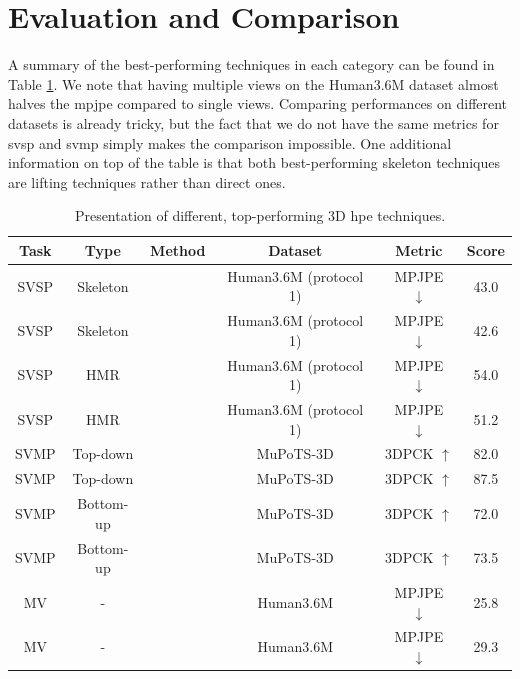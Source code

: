 \documentclass[runningheads]{llncs}
\begin{document}
\section{Evaluation and Comparison}
A summary of the best-performing techniques in each category can be found in Table \ref{table: presentation of results}. We note that having multiple views on the Human3.6M dataset almost halves the \ac{mpjpe} compared to single views. Comparing performances on different datasets is already tricky, but the fact that we do not have the same metrics for \ac{svsp} and \ac{svmp} simply makes the comparison impossible. One additional information on top of the table is that both best-performing skeleton techniques are lifting techniques rather than direct ones.
\begin{table}
  \centering
  \caption{Presentation of different, top-performing 3D \ac{hpe} techniques.}
  \label{table: presentation of results}
  \begin{tabular}{|cccccc|}
    \hline
    Task & Type      & Method                                          & Dataset                & Metric             & Score \\ \hline
    SVSP & Skeleton  & \cite{multi hypothesis transformer}             & Human3.6M (protocol 1) & MPJPE $\downarrow$ & 43.0  \\
    SVSP & Skeleton  & \cite{hrnet}                                    & Human3.6M (protocol 1) & MPJPE $\downarrow$ & 42.6  \\
    SVSP & HMR       & \cite{mesh reconstruction with transformers}    & Human3.6M (protocol 1) & MPJPE $\downarrow$ & 54.0  \\
    SVSP & HMR       & \cite{mesh graphormer}                          & Human3.6M (protocol 1) & MPJPE $\downarrow$ & 51.2  \\ \hline
    SVMP & Top-down  & \cite{HMOR}                                     & MuPoTS-3D              & 3DPCK $\uparrow$   & 82.0  \\
    SVMP & Top-down  & \cite{graph and temporal convolutional network} & MuPoTS-3D              & 3DPCK $\uparrow$   & 87.5  \\
    SVMP & Bottom-up & \cite{PandaNet}                                 & MuPoTS-3D              & 3DPCK $\uparrow$   & 72.0  \\
    SVMP & Bottom-up & \cite{SMAP}                                     & MuPoTS-3D              & 3DPCK $\uparrow$   & 73.5  \\ \hline
    MV   & -         & \cite{Transfusion}                              & Human3.6M              & MPJPE $\downarrow$ & 25.8  \\
    MV   & -         & \cite{MetaFuse}                                 & Human3.6M              & MPJPE $\downarrow$ & 29.3  \\
    \hline
  \end{tabular}
\end{table}
\end{document}
